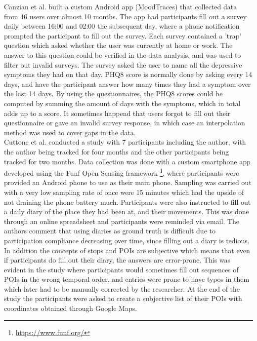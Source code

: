 Canzian et al. built a custom Android app (MoodTraces) that collected data from 46 users over almost 10 months. The app had participants fill out a survey daily between 16:00 and 02:00 the subsequent day, where a phone notification prompted the participant to fill out the survey. Each survey contained a 'trap' question which asked whether the user was currently at home or work. The answer to this question could be verified in the data analysis, and was used to filter out invalid surveys. The survey asked the user to name all the depressive symptoms they had on that day. PHQ8 score is normally done by asking every 14 days, and have the participant answer how many times they had a symptom over the last 14 days. By using the questionnaires, the PHQ8 scores could be computed by summing the amount of days with the symptoms, which in total adds up to a score. It sometimes happend that users forgot to fill out their questionnaire or gave an invalid survey response, in which case an interpolation method was used to cover gaps in the data.\\

Cuttone et al. conducted a study with 7 participants including the author, with the author being tracked for four months and the other participants being tracked for two months. Data collection was done with a custom smartphone app developed using the Funf Open Sensing framework \footnote{\url{https://www.funf.org/}}, where participants were provided an Android phone to use as their main phone. Sampling was carried out with a very low sampling rate of once were 15 minutes which had the upside of not draining the phone battery much. Participants were also instructed to fill out a daily diary of the place they had been at, and their movements. This was done through an online spreadsheet and participants were reminded via email. The authors comment that using diaries as ground truth is difficult due to participation compliance decreasing over time, since filling out a diary is tedious. In addition the concepts of stops and POIs are subjective which means that even if participants do fill out their diary, the answers are error-prone. This was evident in the study where participants would sometimes fill out sequences of POIs in the wrong temporal order, and entries were prone to have typos in them which later had to be manually corrected by the researcher. At the end of the study the participants were asked to create a subjective list of their POIs with coordinates obtained through Google Maps. \\

